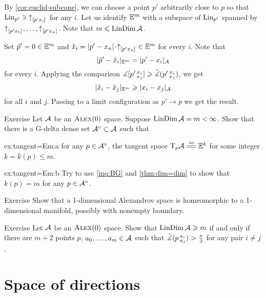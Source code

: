 By \ref{cor:euclid-subcone}, we can choose a point $p'$ arbitrarily close to $p$ so that 
$\mathop{\rm Lin}\nolimits_{p'}\ni {\uparrow}_{[{p'}{x_i}]_{{}}}$ for any $i$.
Let us identify $\mathbb{E}^m$ with a subspace of $\mathop{\rm Lin}\nolimits_{p'}$ spanned by ${\uparrow}_{[{p'}{x_1}]_{{}}},\dots,{\uparrow}_{[{p'}{x_n}]_{{}}}$.
Note that $m\leqslant \mathop{\rm LinDim}\nolimits\mathcal{A}$.

Set $\tilde p'=0\in \mathbb{E}^m$ and $\tilde x_i=\dist{p'}{x_n}{}\cdot\dir{p'}{x_n}\in \EE^m$ for every $i$.
Note that 
\[|\tilde p'-\tilde x_i|_{\mathbb{E}^m}=| p'- x_i|_{\mathcal{A}}\]
for every $i$.
Applying the comparison $\measuredangle[p'\,{}^{x_i}_{x_j}]\geqslant \tilde\measuredangle(p'\,{}^{x_i}_{x_j})$, we get
\[|\tilde x_i-\tilde x_j|_{\mathbb{E}^m}\geqslant |x_i- x_j|_{\mathcal{A}}\]
for all $i$ and $j$.
Passing to a limit configuration as $p'\to p$ we get the result.
\qeds

\begin{thm}[!]{Exercise}\label{ex:tangent=Em}
Let $\mathcal{A}$ be an $\textsc{Alex}(0)$ space.
Suppose $\mathop{\rm LinDim}\nolimits\mathcal{A}=m<\infty$.
Show that there is a G-delta dense set $\mathcal{A}^\circ\subset\mathcal{A}$ such that

\begin{subthm}{ex:tangent=Em:a}
for any $p\in \mathcal{A}^\circ$, the tangent space $\T_p\spc{A}\iso\EE^{k}$ for some integer $k=k(p)\le m$.
\end{subthm}

\begin{subthm}{ex:tangent=Em:b}
Try to use \ref{inq:BG} and \ref{thm:dim=dim} to show that $k(p)=m$ for any $p\in \mathcal{A}^\circ$.
\end{subthm}

\end{thm}


\begin{thm}[!]{Exercise}\label{ex:dim=1}
Show that a 1-dimensional Alexandrov space is homeomorphic to a 1-dimensional manifold, possibly with nonempty boundary.
\end{thm}


\begin{thm}{Exercise}\label{ex:resporka}
Let $\mathcal{A}$ be an $\textsc{Alex}(0)$ space.
Show that $\mathop{\rm LinDim}\nolimits \mathcal{A}\geqslant m$ if and only if there are $m+2$ points $p$, $a_0,\dots, a_{m}\in \mathcal{A}$
such that $\tilde\measuredangle(p\,{}^{a_i}_{a_j})>\tfrac\pi2$ for any pair $i\ne j$.
\end{thm}

\section{Space of directions}

